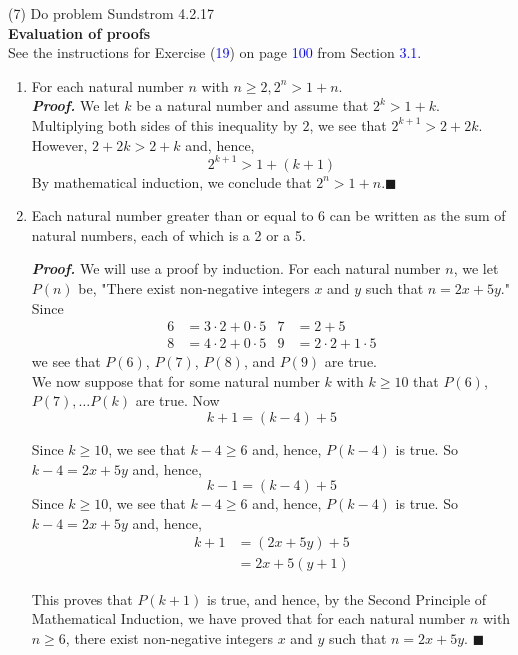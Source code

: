 \documentclass{article}
\begin{document}
(7) Do problem Sundstrom 4.2.17\\
\textbf{Evaluation of proofs}\\
See the instructions for Exercise (\textcolor{blue}{19}) on page \textcolor{blue}{100} from Section \textcolor{blue}{3.1}.
\begin{enumerate}[leftmargin=35px,label=(\textbf{\alph*})]
\item For each natural number $n$ with $n \geq 2, 2^n > 1 + n.$\\
\textit{\textbf{Proof.}} We let $k$ be a natural number and assume that $2^k > 1 + k.$ Multiplying both sides of this inequality by $2$, we see that $2^{k+1} > 2 + 2k.$ However, $2 + 2k > 2 + k$ and, hence,
\begin{equation*}
2^{k+1} > 1 + (k + 1)
\end{equation*}
By mathematical induction, we conclude that $2^n > 1 + n$.\hfill$\blacksquare$

\item Each natural number greater than or equal to 6 can be written as the sum of natural numbers, each of which is a 2 or a 5.

\textbf{\textit{Proof.}} We will use a proof by induction. For each natural number $n$, we let $P(n)$ be, "There exist non-negative integers $x$ and $y$ such that $n = 2x + 5y$." Since
\begin{align*}
    6 &= 3 \cdot 2 + 0 \cdot 5 & 7 &= 2 + 5\\
    8 &= 4 \cdot 2 + 0 \cdot 5 & 9 &= 2 \cdot 2 + 1 \cdot 5
\end{align*}
we see that $P(6)$, $P(7)$, $P(8)$, and $P(9)$ are true.\\
We now suppose that for some natural number $k$ with $k \geq 10$ that $P(6)$, $P(7), \dots P(k)$ are true. Now
\begin{equation*}
k + 1 = (k - 4) + 5
\end{equation*}

Since $k \geq 10$, we see that $k-4 \geq 6$ and, hence, $P(k - 4)$ is true. So $k - 4 = 2x + 5y$ and, hence, 
\begin{equation*}
k - 1 = (k - 4) + 5
\end{equation*}
Since $k \geq 10$, we see that $k - 4 \geq 6$ and, hence, $P(k - 4)$ is true. So $k - 4 = 2x + 5y$ and, hence, 
\begin{align*}
k+1 &= (2x + 5y) + 5\\
&= 2x + 5(y + 1)
\end{align*}

This proves that $P(k+1)$ is true, and hence, by the Second Principle of Mathematical Induction, we have proved that for each natural number $n$ with $n \geq 6$, there exist non-negative integers $x$ and $y$ such that $n = 2x + 5y$. \hfill$\blacksquare$\\
\end{enumerate}
\end{document}
